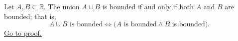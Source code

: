 \begin{corollary}
\label{cor:union-bounded-iff-pieces-bounded}
Let $A,B\subseteq\mathbb{R}$. The union $A\cup B$ is bounded if and only
if both $A$ and $B$ are bounded; that is,
\[
A\cup B\text{ is bounded}
\Longleftrightarrow
\bigl(A\text{ is bounded}\land B\text{ is bounded}\bigr).
\]
\hyperref[prf:union-bounded-iff-pieces-bounded]{Go to proof.}
\end{corollary}
